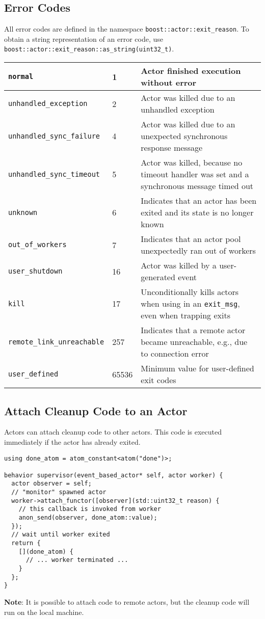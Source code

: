 \subsection{Error Codes}

All error codes are defined in the namespace \lstinline^boost::actor::exit_reason^.
To obtain a string representation of an error code, use \lstinline^boost::actor::exit_reason::as_string(uint32_t)^.

\begin{tabular*}{\textwidth}{m{}m{}m{}}
  \hline
  \lstinline^normal^ & 1 & Actor finished execution without error \\
  \hline
  \lstinline^unhandled_exception^ & 2 & Actor was killed due to an unhandled exception \\
  \hline
  \lstinline^unhandled_sync_failure^ & 4 & Actor was killed due to an unexpected synchronous response message \\
  \hline
  \lstinline^unhandled_sync_timeout^ & 5 & Actor was killed, because no timeout handler was set and a synchronous message timed out \\
  \hline
  \lstinline^unknown^ & 6 & Indicates that an actor has been exited and its state is no longer known \\
  \hline
  \lstinline^out_of_workers^ & 7 & Indicates that an actor pool unexpectedly ran out of workers \\
  \hline
  \lstinline^user_shutdown^ & 16 & Actor was killed by a user-generated event \\
  \hline
  \lstinline^kill^ & 17 & Unconditionally kills actors when using in an \lstinline^exit_msg^, even when trapping exits \\
  \hline
  \lstinline^remote_link_unreachable^ & 257 & Indicates that a remote actor became unreachable, e.g., due to connection error \\
  \hline
  \lstinline^user_defined^ & 65536 & Minimum value for user-defined exit codes \\
  \hline
\end{tabular*}

\subsection{Attach Cleanup Code to an Actor}

Actors can attach cleanup code to other actors.
This code is executed immediately if the actor has already exited.

\begin{lstlisting}
using done_atom = atom_constant<atom("done")>;

behavior supervisor(event_based_actor* self, actor worker) {
  actor observer = self;
  // "monitor" spawned actor
  worker->attach_functor([observer](std::uint32_t reason) {
    // this callback is invoked from worker
    anon_send(observer, done_atom::value);
  });
  // wait until worker exited
  return {
    [](done_atom) {
      // ... worker terminated ...
    }
  };
}
\end{lstlisting}

\textbf{Note}: It is possible to attach code to remote actors, but the cleanup code will run on the local machine.
